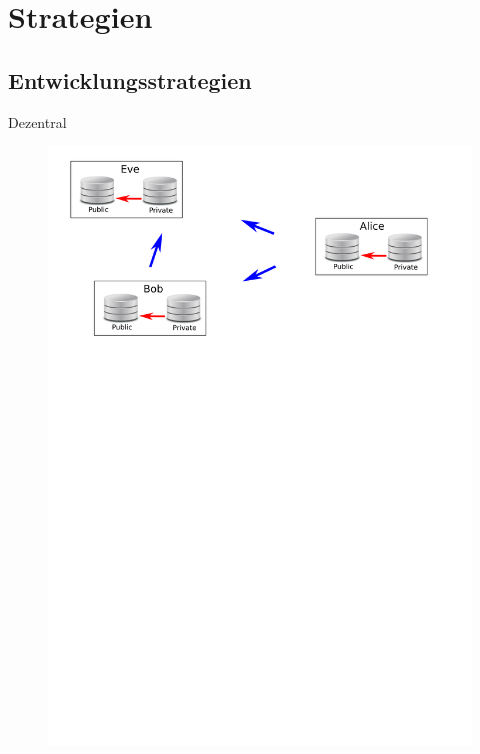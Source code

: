 \documentclass[presentation]{beamer}
\begin{document}
\section{Strategien}
\subsection{Entwicklungsstrategien}
\begin{frame}{Dezentral}
  \begin{figure}
    \centering
    \includegraphics[width=\textwidth]{img/decentral-setup}
  \end{figure}
\end{frame}
\end{document}
